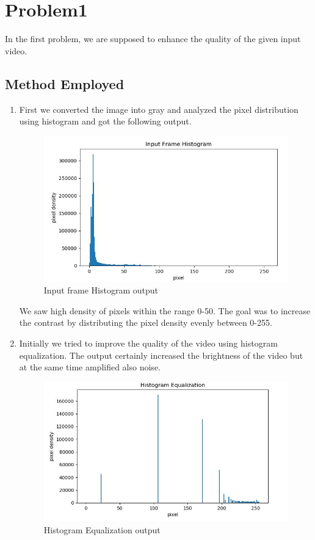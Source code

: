 \documentclass[12pt]{article}
\begin{document}
\section{Problem1}
In the first problem, we are supposed to enhance the quality of the given input video.

\subsection{Method Employed}
\begin{enumerate}
\item First we converted the image into gray and analyzed the pixel distribution using histogram and got the following output.

\begin{figure}[h]
    \centering
    \includegraphics[width=12cm]{inputhistogramoutput}
    \caption{Input frame Histogram output}
    \label{fig:inputhistogramoutput}
\end{figure}

We saw high density of pixels within the range 0-50. The goal was to increase the contrast by distributing the pixel density evenly between 0-255.

\item Initially we tried to improve the quality of the video using histogram equalization. The output certainly increased the brightness of the video but at the same time amplified also noise.

\begin{figure}[h]
    \centering
    \includegraphics[width=12cm]{histogramequalization}
    \caption{Histogram Equalization output}
    \label{fig:histogramequalization}
\end{figure}


\end{enumerate}
\end{document}
